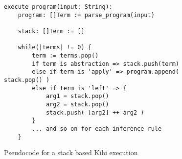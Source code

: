 \begin{figure}[htb]
    \centering
    \begin{lstlisting}
execute_program(input: String):
    program: []Term := parse_program(input)
    
    stack: []Term := []
    
    while(|terms| != 0) {
        term := terms.pop()
        if term is abstraction => stack.push(term)
        else if term is 'apply' => program.append( stack.pop() )
        else if term is 'left' => {
            arg1 = stack.pop()
            arg2 = stack.pop()
            stack.push( [arg2] ++ arg2 )
        }
        ... and so on for each inference rule
    }
    \end{lstlisting}
    \caption{Pseudocode for a stack based Kihi execution}
    \label{fig:stack_pseudocode}
\end{figure}